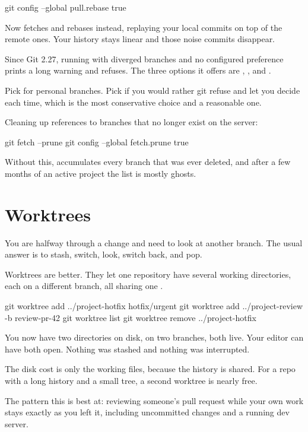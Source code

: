 \documentclass[11pt]{article}
\begin{document}
\begin{shell}
git config --global pull.rebase true
\end{shell}

Now  fetches and rebases instead, replaying your local commits on top of
the remote ones. Your history stays linear and those noise commits disappear.

\begin{trap}
Since Git 2.27, running  with diverged branches and no configured
preference prints a long warning and refuses. The three options it offers are
, , and .

Pick  for personal branches. Pick  if you would rather git refuse
and let you decide each time, which is the most conservative choice and a reasonable
one.
\end{trap}

Cleaning up references to branches that no longer exist on the server:

\begin{shell}
git fetch --prune
git config --global fetch.prune true
\end{shell}

Without this,  accumulates every branch that was ever deleted, and
after a few months of an active project the list is mostly ghosts.

\section{Worktrees}

You are halfway through a change and need to look at another branch. The usual
answer is to stash, switch, look, switch back, and pop.

Worktrees are better. They let one repository have several working directories, each
on a different branch, all sharing one .

\begin{shell}
git worktree add ../project-hotfix hotfix/urgent
git worktree add ../project-review -b review-pr-42
git worktree list
git worktree remove ../project-hotfix
\end{shell}

You now have two directories on disk, on two branches, both live. Your editor can
have both open. Nothing was stashed and nothing was interrupted.

\begin{why}
The disk cost is only the working files, because the history is shared. For a repo
with a long history and a small tree, a second worktree is nearly free.

The pattern this is best at: reviewing someone's pull request while your own work
stays exactly as you left it, including uncommitted changes and a running dev
server.
\end{why}
\end{document}
